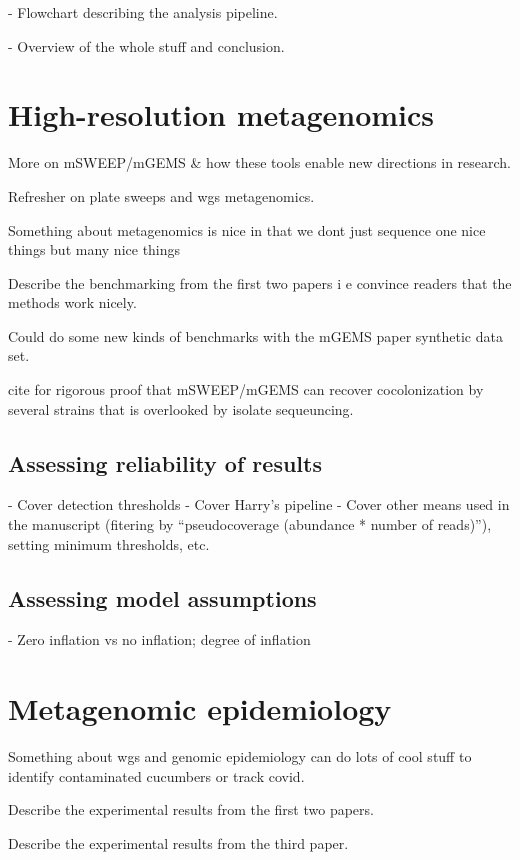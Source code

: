 \documentclass[officiallayout]{tktla}
\begin{document}
- Flowchart describing the analysis pipeline.

- Overview of the whole stuff and conclusion.

\chapter{High-resolution metagenomics}

More on mSWEEP/mGEMS \& how these tools enable new directions in research.

Refresher on plate sweeps and wgs metagenomics.

Something about metagenomics is nice in that we dont just sequence one
nice things but many nice things

Describe the benchmarking from the first two papers i e convince readers that the methods work nicely.

Could do some new kinds of benchmarks with the mGEMS paper synthetic data set.

cite \citet{tonkin-hill_pneumococcal_2022} for rigorous proof that
mSWEEP/mGEMS can recover cocolonization by several strains that is
overlooked by isolate sequeuncing.

\section{Assessing reliability of results}

- Cover detection thresholds
- Cover Harry's pipeline
- Cover other means used in the manuscript (fitering by ``pseudocoverage (abundance * number of reads)''), setting minimum thresholds, etc.

\section{Assessing model assumptions}
- Zero inflation vs no inflation; degree of inflation


\chapter{Metagenomic epidemiology}

Something about wgs and genomic epidemiology can do lots of cool stuff
to identify contaminated cucumbers or track covid.

Describe the experimental results from the first two papers.

Describe the experimental results from the third paper.
\end{document}
